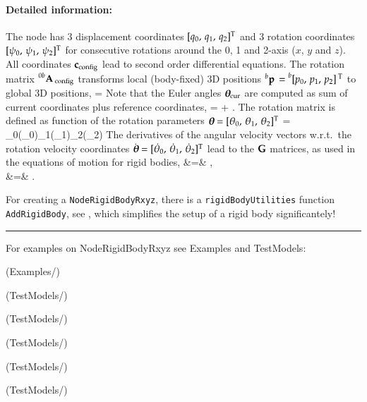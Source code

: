     \paragraph{Detailed information:}
    The node has 3 displacement coordinates $[q_0,\,q_1,\,q_2]^\mathrm{T}$ and 3 rotation coordinates $[\psi_0,\,\psi_1,\,\psi_2]^\mathrm{T}$ for consecutive rotations around the 0, 1 and 2-axis ($x$, $y$ and $z$).
    All coordinates $\mathbf{c}_\mathrm{config}$ lead to second order differential equations.
    The rotation matrix $\prescript{0b}{}{\mathbf{A}}\,_\mathrm{config}$ transforms local (body-fixed) 3D positions $\prescript{b}{}{\mathbf{p}}\, = \prescript{b}{}{[p_0,\,p_1,\,p_2]}\,^\mathrm{T}$ to global 3D positions,
    \be
      \cConfig = \cConfig {} 
    \ee
    Note that the Euler angles $\mbox{\boldmath $\theta$ \unboldmath}\!\!_\mathrm{cur}$ are computed as sum of current coordinates plus reference coordinates,
    \be
      \ttheta\cCur = \tpsi\cCur + \tpsi\cRef.
    \ee
    The rotation matrix is defined as function of the rotation parameters $\mbox{\boldmath $\theta$ \unboldmath}\!\!=[\theta_0,\,\theta_1,\,\theta_2]^\mathrm{T}$
    \be
       = \Rot_0(\theta_0)\Rot_1(\theta_1)\Rot_2(\theta_2)
    \ee
    The derivatives of the angular velocity vectors w.r.t.\ the rotation velocity coordinates $\dot {\mbox{\boldmath $\theta$ \unboldmath}\!\!}=[\dot \theta_0,\,\dot \theta_1,\,\dot \theta_2]^\mathrm{T}$ lead to the $\mathbf{G}$ matrices, as used in the equations of motion for rigid bodies,
    \bea
       &=&  \dot \ttheta, \\
       &=&  \dot \ttheta.
    \eea
    
    For creating a \texttt{NodeRigidBodyRxyz}, there is a \texttt{rigidBodyUtilities} function \texttt{AddRigidBody}, 
    see , which simplifies the setup of a rigid body significantely!
\vspace{6pt}\par\noindent\rule{\textwidth}{0.4pt}
%
\noindent For examples on NodeRigidBodyRxyz see Examples and TestModels:
\bi
\item {} (Examples/)
\item {} (TestModels/)
\item {} (TestModels/)
\item {} (TestModels/)
\item {} (TestModels/)
\item {} (TestModels/)
\ei

